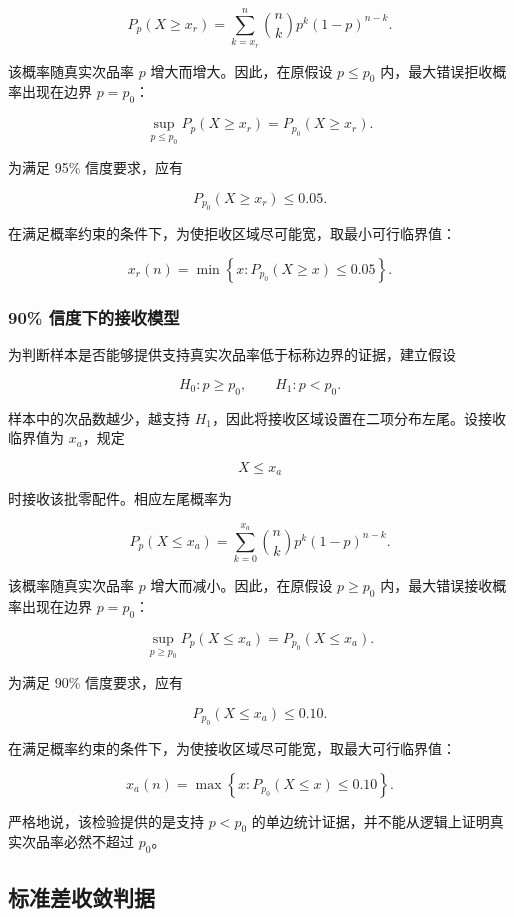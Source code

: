 \documentclass{cumcm}
\numberwithin{figure}{section}
\numberwithin{table}{section}
\begin{document}
\[
P_p(X\ge x_r)
=
\sum_{k=x_r}^{n}
\binom{n}{k}p^k(1-p)^{n-k}. \tag{7}
\]

该概率随真实次品率 \(p\) 增大而增大。因此，在原假设 \(p\le p_0\) 内，最大错误拒收概率出现在边界 \(p=p_0\)：

\[
\sup_{p\le p_0}P_p(X\ge x_r)
=P_{p_0}(X\ge x_r). \tag{8}
\]

为满足 95\% 信度要求，应有

\[
P_{p_0}(X\ge x_r)\le0.05.
\]

在满足概率约束的条件下，为使拒收区域尽可能宽，取最小可行临界值：

\[
x_r(n)=
\min\left\{
x:P_{p_0}(X\ge x)\le0.05
\right\}.
\tag{9}
\]

\subsubsection{90\% 信度下的接收模型}\label{ux4fe1ux5ea6ux4e0bux7684ux63a5ux6536ux6a21ux578b}

为判断样本是否能够提供支持真实次品率低于标称边界的证据，建立假设

\[
H_0:p\ge p_0,\qquad H_1:p<p_0. \tag{10}
\]

样本中的次品数越少，越支持 \(H_1\)，因此将接收区域设置在二项分布左尾。设接收临界值为 \(x_a\)，规定

\[
X\le x_a
\]

时接收该批零配件。相应左尾概率为

\[
P_p(X\le x_a)
=
\sum_{k=0}^{x_a}
\binom{n}{k}p^k(1-p)^{n-k}. \tag{11}
\]

该概率随真实次品率 \(p\) 增大而减小。因此，在原假设 \(p\ge p_0\) 内，最大错误接收概率出现在边界 \(p=p_0\)：

\[
\sup_{p\ge p_0}P_p(X\le x_a)
=P_{p_0}(X\le x_a). \tag{12}
\]

为满足 90\% 信度要求，应有

\[
P_{p_0}(X\le x_a)\le0.10.
\]

在满足概率约束的条件下，为使接收区域尽可能宽，取最大可行临界值：

\[
x_a(n)=
\max\left\{
x:P_{p_0}(X\le x)\le0.10
\right\}.
\tag{13}
\]

严格地说，该检验提供的是支持 \(p<p_0\) 的单边统计证据，并不能从逻辑上证明真实次品率必然不超过 \(p_0\)。

\subsection{标准差收敛判据}\label{ux6807ux51c6ux5deeux6536ux655bux5224ux636e}
\end{document}
